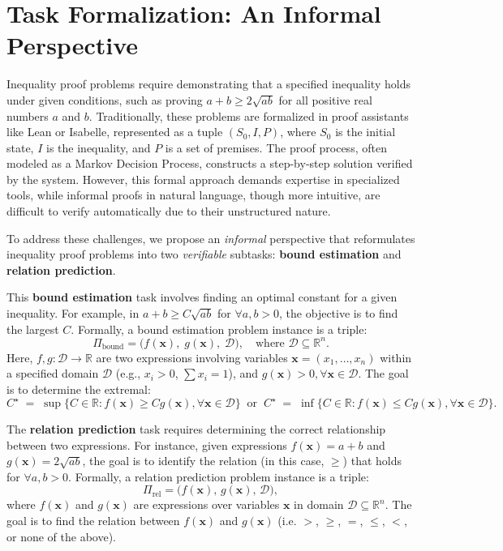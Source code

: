 \vspace{-2mm}
\section{Task Formalization: An Informal Perspective}
\label{sec:task_formalization}
\vspace{-2mm}

Inequality proof problems require demonstrating that a specified inequality holds under given conditions, such as proving $a + b \geq 2\sqrt{ab}$ for all positive real numbers $a$ and $b$. Traditionally, these problems are formalized in proof assistants like Lean or Isabelle, represented as a tuple $(S_0, I, P)$, where $S_0$ is the initial state, $I$ is the inequality, and $P$ is a set of premises. The proof process, often modeled as a Markov Decision Process, constructs a step-by-step solution verified by the system. However, this formal approach demands expertise in specialized tools, while informal proofs in natural language, though more intuitive, are difficult to verify automatically due to their unstructured nature.


To address these challenges, we propose an \textit{informal} perspective that reformulates inequality proof problems into two \textit{verifiable} subtasks: \textbf{bound estimation} and \textbf{relation prediction}. 
\vspace{-2mm}

\vspace{-1mm}

This \textbf{bound estimation} task involves finding an optimal constant for a given inequality. For example, in $a + b \geq C \sqrt{ab}$ for $\forall a, b > 0$, the objective is to find the largest $C$. Formally, a bound estimation problem instance is a triple:
$$ \Pi_{\text{bound}}=\bigl(f(\mathbf{x}),\; g(\mathbf{x}),\; \mathcal D\bigr), \quad \text{where } \mathcal D \subseteq \mathbb R^n. $$
Here, $f,g:\mathcal D\to\mathbb R$ are two expressions involving variables $\mathbf x=(x_1,\dots,x_n)$ within a specified domain $\mathcal D$ (e.g., $x_i>0$, $\sum x_i = 1$), and $g(\mathbf{x}) > 0, \forall \mathbf{x}\in \mathcal D$. The goal is to determine the extremal:
$$ 
C^\star \;=\;\sup  \{C\in\mathbb{R}: f(\mathbf x) \geq C g(\mathbf x), \forall \mathbf x\in\mathcal D\}\;\; \text{or}\;\; C^\star \;=\;\inf  \{C\in\mathbb{R}: f(\mathbf x) \leq C g(\mathbf x), \forall \mathbf x\in\mathcal D\}.
$$


The \textbf{relation prediction} task requires determining the correct relationship between two expressions. For instance, given expressions $f(\mathbf{x}) = a+b$ and $g(\mathbf{x}) = 2\sqrt{ab}$, the goal is to identify the relation (in this case, $\ge$) that holds for $\forall a,b > 0$. Formally, a relation prediction problem instance is a triple:
$$ \Pi_{\text{rel}}=\bigl(f(\mathbf x),\,g(\mathbf x),\,\mathcal D\bigr),$$
where $f(\mathbf{x})$ and $g(\mathbf{x})$ are expressions over variables $\mathbf{x}$ in domain $\mathcal D \subseteq \mathbb R^n$. The goal is to find the relation between $f(\mathbf{x})$ and $g(\mathbf{x})$ (i.e. $>$, $\ge$, $=$, $\le$, $<$, or none of the above).


